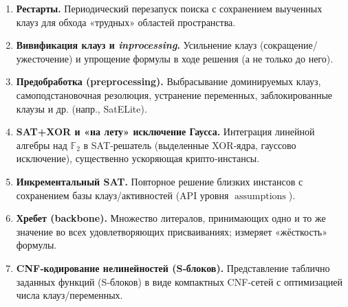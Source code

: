 \begin{enumerate}
\item \label{defsat:restarts}
\textbf{Рестарты.}
Периодический перезапуск поиска с сохранением выученных клауз для обхода «трудных» областей пространства.~\cite{GomesSelmanKautz1998}

\item \label{defsat:vivif}
\textbf{Вивификация клауз и \emph{inprocessing}.}
Усильнение клауз (сокращение/ужесточение) и упрощение формулы в ходе решения (а не только до него).~\cite{JarvisaloHeuleBiere2012}

\item \label{defsat:preproc}
\textbf{Предобработка (preprocessing).}
Выбрасывание доминируемых клауз, самоподстановочная резолюция, устранение переменных, заблокированные клаузы и др. (напр., SatELite).~\cite{EenBiere2005}

\item \label{defsat:xorgauss}
\textbf{SAT+XOR и «на лету» исключение Гаусса.}
Интеграция линейной алгебры над \(\mathbb{F}_2\) в SAT‑решатель (выделенные XOR‑ядра, гауссово исключение), существенно ускоряющая крипто‑инстансы.~\cite{SoosNohlCastelluccia2009}

\item \label{defsat:incr}
\textbf{Инкрементальный SAT.}
Повторное решение близких инстансов с сохранением базы клауз/активностей (API уровня \(\operatorname{assumptions}\)).~\cite{EenSorensson2003}

\item \label{defsat:backbone}
\textbf{Хребет (backbone).}
Множество литералов, принимающих одно и то же значение во всех удовлетворяющих присваиваниях; измеряет «жёсткость» формулы.~\cite{HandbookSAT2021}

\item \label{defsat:sbox}
\textbf{CNF‑кодирование нелинейностей (S‑блоков).}
Представление таблично заданных функций (S‑блоков) в виде компактных CNF‑сетей с оптимизацией числа клауз/переменных.~\cite{HandbookSAT2021}

\end{enumerate}





